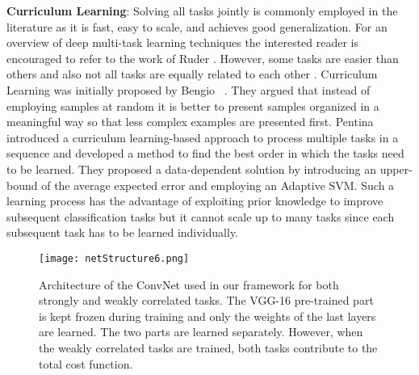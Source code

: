 \documentclass[10pt,twocolumn,letterpaper]{article}
\begin{document}
	\noindent\textbf{Curriculum Learning}: Solving all tasks jointly is commonly employed in the literature \cite{ciregan2012multi, hand2016attributes, zhu2015multi} as it is fast, easy to scale, and achieves good generalization. For an overview of deep multi-task learning techniques the interested reader is encouraged to refer to the work of Ruder \cite{ruder2017overview}. However, some tasks are easier than others and also not all tasks are equally related to each other \cite{pentina2015curriculum}. Curriculum Learning was initially proposed by Bengio \etal~\cite{bengio2009curriculum}. They argued that instead of employing samples at random it is better to present samples organized in a meaningful way so that less complex examples are presented first. Pentina \etal~\cite{pentina2015curriculum} introduced a curriculum learning-based approach to process multiple tasks in a sequence and developed a method to find the best order in which the tasks need to be learned. They proposed a data-dependent solution by introducing an upper-bound of the average expected error and employing an Adaptive SVM. Such a learning process has the advantage of exploiting prior knowledge to improve subsequent classification tasks but it cannot scale up to many tasks since each subsequent task has to be learned individually. 
	
	\begin{figure*}[t] 
		\centering
		\texttt{[image: netStructure6.png]}
		\caption{Architecture of the ConvNet used in our framework for both strongly and weakly correlated tasks. The VGG-16 pre-trained part is kept frozen during training and only the weights of the last layers are learned. The two parts are learned separately. However, when the weakly correlated tasks are trained, both tasks contribute to the total cost function.}
		\label{fig:Method}
	\end{figure*}
	
%	
\end{document}

